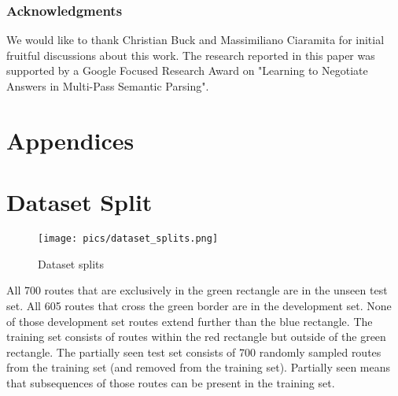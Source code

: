 \documentclass[11pt,a4paper]{article}
\begin{document}
\subsubsection*{Acknowledgments}
We would like to thank Christian Buck and Massimiliano Ciaramita for initial fruitful discussions about this work.
The research reported in this paper was supported by a Google Focused Research Award on "Learning to Negotiate Answers in Multi-Pass Semantic Parsing". 




\clearpage
\appendix
{}
\section*{Appendices}
\section{Dataset Split}
\begin{figure}[ht]
    \centering
    \texttt{[image: pics/dataset\_splits.png]}
    \caption{Dataset splits}
    \label{fig:splits}
\end{figure}
All 700 routes that are exclusively in the green rectangle are in the unseen test set. All 605 routes that cross the green border are in the development set. None of those development set routes extend further than the blue rectangle. The training set consists of routes within the red rectangle but outside of the green rectangle. The partially seen test set consists of 700 randomly sampled routes from the training set (and removed from the training set). Partially seen means that subsequences of those routes can be present in the training set.
\end{document}
